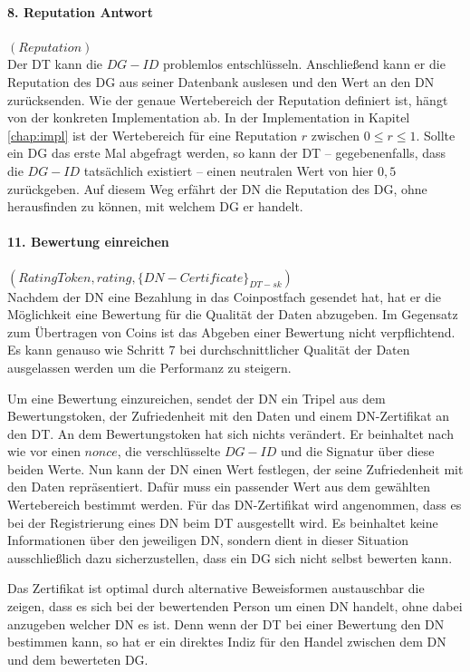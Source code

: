 \documentclass[
	fontsize=11pt,
	headings=small,
	parskip=half,           %
	bibliography=totoc,
	numbers=noenddot,       %
	open=any,               %
]{scrreprt}
\begin{document}
\paragraph{8. Reputation Antwort}$(Reputation)$\\
Der DT kann die $DG-ID$ problemlos entschlüsseln. Anschließend kann er die Reputation des DG aus seiner Datenbank auslesen und den Wert an den DN zurücksenden. Wie der genaue Wertebereich der Reputation definiert ist, hängt von der konkreten Implementation ab. In der Implementation in Kapitel \ref{chap:impl} ist der Wertebereich für eine Reputation $r$ zwischen $0\leq r\leq 1$. Sollte ein DG das erste Mal abgefragt werden, so kann der DT -- gegebenenfalls, dass die $DG-ID$ tatsächlich existiert -- einen neutralen Wert von hier $0,5$ zurückgeben. Auf diesem Weg erfährt der DN die Reputation des DG, ohne herausfinden zu können, mit welchem DG er handelt.

\paragraph{11. Bewertung einreichen}$(RatingToken, rating, {\{DN-Certificate\}}_{DT-sk})$\\
Nachdem der DN eine Bezahlung in das Coinpostfach gesendet hat, hat er die Möglichkeit eine Bewertung für die Qualität der Daten abzugeben. Im Gegensatz zum Übertragen von Coins ist das Abgeben einer Bewertung nicht verpflichtend. Es kann genauso wie Schritt 7 bei durchschnittlicher Qualität der Daten ausgelassen werden um die Performanz zu steigern. 

Um eine Bewertung einzureichen, sendet der DN ein Tripel aus dem Bewertungstoken, der Zufriedenheit mit den Daten und einem DN-Zertifikat an den DT. An dem Bewertungstoken hat sich nichts verändert. Er beinhaltet nach wie vor einen $nonce$, die verschlüsselte $DG-ID$ und die Signatur über diese beiden Werte. Nun kann der DN einen Wert festlegen, der seine Zufriedenheit mit den Daten repräsentiert. Dafür muss ein passender Wert aus dem gewählten Wertebereich bestimmt werden. Für das DN-Zertifikat wird angenommen, dass es bei der Registrierung eines DN beim DT ausgestellt wird. Es beinhaltet keine Informationen über den jeweiligen DN, sondern dient in dieser Situation ausschließlich dazu sicherzustellen, dass ein DG sich nicht selbst bewerten kann. 

Das Zertifikat ist optimal durch alternative Beweisformen austauschbar die zeigen, dass es sich bei der bewertenden Person um einen DN handelt, ohne dabei anzugeben welcher DN es ist. Denn wenn der DT bei einer Bewertung den DN bestimmen kann, so hat er ein direktes Indiz für den Handel zwischen dem DN und dem bewerteten DG.
\end{document}
